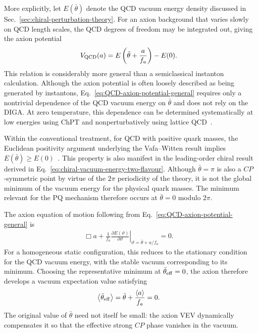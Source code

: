 \documentclass[review]{elsarticle}
\numberwithin{equation}{section}
\numberwithin{table}{section}
\numberwithin{figure}{section}
\begin{document}
More explicitly, let $E(\bar\theta)$ denote the QCD vacuum energy density discussed in Sec.~\ref{sec:chiral-perturbation-theory}. For an axion background that varies slowly on QCD length scales, the QCD degrees of freedom may be integrated out, giving the axion potential
\begin{align}
    V_{\rm QCD}(a) = E\left(\bar\theta+\frac{a}{f_a}
    \right) - E(0).
    \label{eq:QCD-axion-potential-general}
\end{align}
This relation is considerably more general than a semiclassical instanton calculation. Although the axion potential is often loosely described as being generated by instantons, Eq.~\eqref{eq:QCD-axion-potential-general} requires only a nontrivial dependence of the QCD vacuum energy on $\bar\theta$ and does not rely on the DIGA. At zero temperature, this dependence can be determined systematically at low energies using ChPT and nonperturbatively using lattice QCD~\cite{DiVecchia:1980yfw,Leutwyler:1992yt,GrilliDiCortona:2015jxo,DiLuzio:2020wdo}.

Within the conventional treatment, for QCD with positive quark masses, the Euclidean positivity argument underlying the Vafa--Witten result implies
$E(\bar\theta)\geq E(0)$~\cite{Vafa:1983tf,Vafa:1984xg}. This property is also manifest in the leading-order chiral result derived in Eq.~\eqref{eq:chiral-vacuum-energy-two-flavour}. Although $\bar\theta=\pi$ is also a $CP$-symmetric point by virtue of the $2\pi$ periodicity of the theory, it is not the global minimum of the vacuum energy for the physical quark masses. The minimum relevant for the PQ mechanism therefore occurs at $\bar\theta=0$ modulo $2\pi$.

The axion equation of motion following from Eq.~\eqref{eq:QCD-axion-potential-general} is
\begin{align}
    \Box a + \frac{1}{f_a} \left. \frac{\partial E(\vartheta)}{\partial\vartheta} \right|_{\vartheta=\bar\theta+a/f_a}
    = 0.
    \label{eq:axion-relaxation-eom}
\end{align}
For a homogeneous static configuration, this reduces to the stationary condition for the QCD vacuum energy, with the stable vacuum corresponding to its minimum. Choosing the representative minimum at $\bar\theta_{\rm eff}=0$, the axion therefore develops a vacuum expectation value satisfying
\begin{align}
    \left\langle\bar\theta_{\rm eff}\right\rangle = 
    \bar\theta + \frac{\langle a\rangle}{f_a} = 0.
    \label{eq:PQ-relaxation-minimum}
\end{align}
The original value of $\bar\theta$ need not itself be small: the axion VEV dynamically compensates it so that the effective strong $CP$ phase vanishes in the vacuum.
\end{document}
